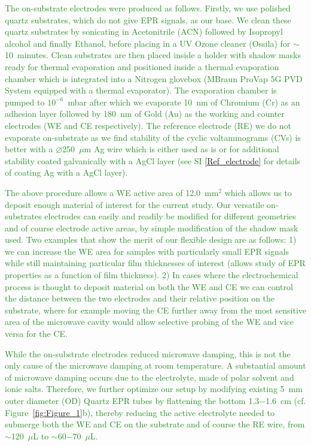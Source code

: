 \documentclass{WileyMSP-template}
\newcommand{\np}[1]{\textcolor{ForestGreen}{#1}}
\begin{document}
\np{	
The on-substrate electrodes were produced as follows. Firstly, we use polished quartz substrates, which do not give EPR signals, as our base. We clean these quartz substrates by sonicating in Acetonitrile (ACN) followed by Isopropyl alcohol and finally Ethanol, before placing in a UV Ozone cleaner (Ossila) for $\sim$10~minutes. Clean substrates are then placed inside a holder with shadow masks ready for thermal evaporation and positioned inside a thermal evaporation chamber which is integrated into a Nitrogen glovebox (MBraun ProVap 5G PVD System equipped with a thermal evaporator). The evaporation chamber is pumped to $10^{-6}$~mbar after which we evaporate 10~nm of Chromium (Cr) as an adhesion layer followed by 180~nm of Gold (Au) as the working and counter electrodes (WE and CE respectively). The reference electrode (RE) we do not evaporate on-substrate as we find stability of the cyclic voltammograms (CVs) is better with a $\varnothing$250~$\mu$m Ag wire which is either used as is or for additional stability coated galvanically with a AgCl layer (see SI \ref{Ref_electrode} for details of coating Ag with a AgCl layer). 
}

\bigbreak

\np{
The above procedure allows a WE active area of 12.0~mm$^2$ which allows us to deposit enough material of interest for the current study. Our versatile on-substrates electrodes can easily and readily be modified for different geometries and of course electrode active areas, by simple modification of the shadow mask used. Two examples that show the merit of our flexible design are as follows: 1) we can increase the WE area for samples with particularly small EPR signals while still maintaining particular film thicknesses of interest (allows study of EPR properties as a function of film thickness). 2) In cases where the electrochemical process is thought to deposit material on both the WE and CE we can control the distance between the two electrodes and their relative position on the substrate, where for example moving the CE further away from the most sensitive area of the microwave cavity would allow selective probing of the WE and vice versa for the CE.
}

\bigbreak

\np{
While the on-substrate electrodes reduced microwave damping, this is not the only cause of the microwave damping at room temperature. A substantial amount of microwave damping occurs due to the electrolyte, made of polar solvent and ionic salts. Therefore, we further optimize our setup by modifying existing 5~mm outer diameter (OD) Quartz EPR tubes by flattening the bottom 1.3$-$1.6~cm (cf. Figure~\ref{fig:Figure_1}b), thereby reducing the active electrolyte needed to submerge both the WE and CE on the substrate and of course the RE wire, from $\sim$120~$\mu$L to $\sim$60$-$70~$\mu$L. 
}
\end{document}
